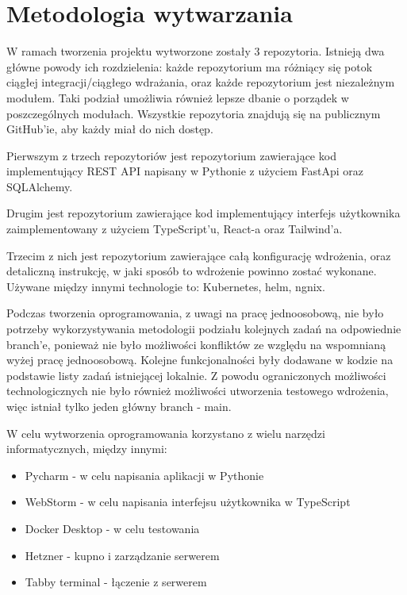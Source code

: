 \newpage 
\section{Metodologia wytwarzania}
W ramach tworzenia projektu  wytworzone zostały 3 repozytoria. Istnieją dwa główne powody ich rozdzielenia: każde repozytorium ma różniący się potok ciągłej integracji/ciągłego wdrażania, oraz każde repozytorium jest niezależnym modułem. Taki podział umożliwia również lepsze dbanie o porządek w poszczególnych modułach. Wszystkie repozytoria znajdują się na publicznym GitHub'ie, aby każdy miał do nich dostęp. 

Pierwszym z trzech repozytoriów jest repozytorium zawierające kod implementujący REST API napisany w Pythonie z użyciem FastApi oraz SQLAlchemy.

Drugim jest repozytorium zawierające kod implementujący interfejs użytkownika zaimplementowany z użyciem TypeScript'u, React-a oraz Tailwind'a.

Trzecim z nich jest repozytorium zawierające całą konfigurację wdrożenia, oraz detaliczną instrukcję, w jaki sposób to wdrożenie powinno zostać wykonane. Używane między innymi technologie to: Kubernetes, helm, ngnix.

Podczas tworzenia oprogramowania, z uwagi na  pracę jednoosobową, nie było potrzeby wykorzystywania metodologii podziału kolejnych zadań na odpowiednie branch'e, ponieważ nie było możliwości konfliktów ze względu na wspomnianą wyżej pracę jednoosobową. Kolejne funkcjonalności były dodawane w kodzie  na podstawie listy zadań istniejącej lokalnie. Z powodu ograniczonych możliwości technologicznych nie było również możliwości utworzenia testowego wdrożenia, więc istniał tylko jeden główny branch - main.

W celu wytworzenia oprogramowania korzystano z wielu narzędzi informatycznych, między innymi: 
\begin{itemize}
    \item Pycharm - w celu napisania aplikacji w Pythonie
    \item WebStorm - w celu napisania interfejsu użytkownika w TypeScript
    \item Docker Desktop - w celu testowania
    \item Hetzner - kupno i zarządzanie serwerem
    \item Tabby terminal - łączenie z serwerem
\end{itemize}